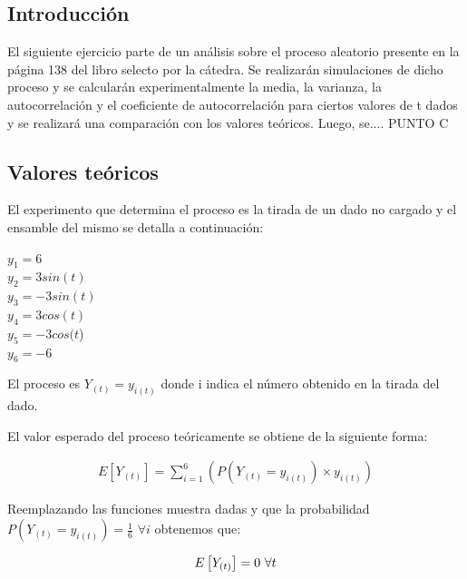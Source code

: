 

\subsection{Introducción}

El siguiente ejercicio parte de un análisis sobre el proceso aleatorio presente en la página 138 del libro selecto por la cátedra. Se realizarán simulaciones de dicho proceso y se calcularán experimentalmente la media, la varianza, la autocorrelación y el coeficiente de autocorrelación para ciertos valores de t dados y se realizará una comparación con los valores teóricos.
Luego, se.... PUNTO C 

\subsection{Valores teóricos}

El experimento que determina el proceso es la tirada de un dado no cargado y el ensamble del mismo se detalla a continuación:

\begin{center}		%
	 $y_{1} = 6$\\
	 $y_{2} = 3sin(t)$\\
	 $y_{3} = -3sin(t)$\\
	 $y_{4} = 3cos(t)$\\
	 $y_{5} = -3cos(t$)\\
	 $y_{6} = -6$\\
\end{center}

El proceso es $Y_{(t)} = y_{i(t)}$ donde i indica el número obtenido en la tirada del dado.

El valor esperado del proceso teóricamente se obtiene de la siguiente forma:

\begin{equation*}
\begin{gathered}
	E\left[Y_{(t)}\right] = \sum_{i=1}^{6}\left( P(Y_{(t)} = y_{i(t)}) \times y_{i(t)}\right) 
\end{gathered}
\end{equation*}

Reemplazando las funciones muestra dadas y que la probabilidad $P(Y_{(t)} = y_{i(t)})= \frac{1}{6}$ $ \forall i $ obtenemos que:

\begin{equation*}
\begin{gathered}
	E\left[Y_{(t)}\right] = 0$ $\forall t 
\end{gathered}
\end{equation*}

